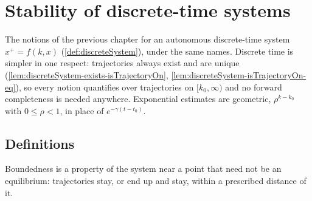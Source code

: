
\chapter{Stability of discrete-time systems}

The notions of the previous chapter for an autonomous discrete-time system $x^{+} = f(k, x)$
(\cref{def:discreteSystem}), under the same names.  Discrete time is simpler in one respect:
trajectories always exist and are unique (\cref{lem:discreteSystem-exists-isTrajectoryOn},
\cref{lem:discreteSystem-isTrajectoryOn-eq}), so every notion quantifies over trajectories on
$[k_0, \infty)$ and no forward completeness is needed anywhere.  Exponential estimates are
geometric, $\rho^{k - k_0}$ with $0 \le \rho < 1$, in place of $e^{-\gamma(t - t_0)}$.

\section{Definitions}












Boundedness is a property of the system near a point that need not be an equilibrium:
trajectories stay, or end up and stay, within a prescribed distance of it.



